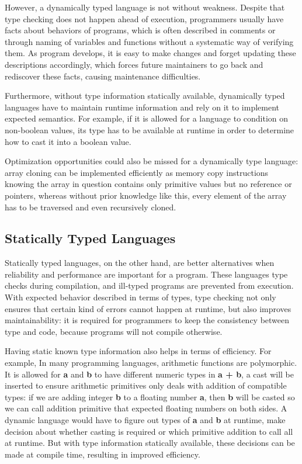 However, a dynamically typed language is not without weakness.
Despite that type checking does not happen ahead of execution,
programmers usually have facts about behaviors of programs,
which is often described in comments or through naming of variables and functions without a systematic way of verifying them.
As program develops, it is easy to make changes and forget updating these descriptions accordingly, which forces future maintainers to go back and rediscover these facts, causing maintenance difficulties.

Furthermore, without type information statically available,
dynamically typed languages have to maintain runtime information and rely on it to implement expected semantics. For example, if it is allowed for a language to condition on non-boolean values, its type has to be available at runtime in order to determine how to cast it into a boolean value.

Optimization opportunities could also be missed for a dynamically type language: 
array cloning can be implemented efficiently as memory copy instructions knowing the array in question contains only primitive values but no reference or pointers, whereas without prior knowledge like this, every element of the array has to be traversed and even recursively cloned.

\subsection{Statically Typed Languages}

Statically typed languages, on the other hand, are better alternatives
when reliability and performance are important for a program.
These languages type checks during compilation, and ill-typed programs are prevented from execution.
With expected behavior described in terms of types, type checking not only ensures that certain kind of errors cannot happen at runtime, but also improves maintainability: it is required for programmers to keep the consistency between type and code, because programs will not compile otherwise.

Having static known type information also helps in terms of efficiency.
For example, In many programming languages, arithmetic functions are polymorphic.
It is allowed for \textbf{a} and \textbf{b} to have different numeric types in \textbf{a + b}, a cast will be inserted to ensure arithmetic primitives only deals with addition of compatible types: if we are adding integer \textbf{b} to a floating number \textbf{a}, then \textbf{b} will be casted so we can call addition primitive that expected floating numbers on both sides.
A dynamic language would have to figure out types of \textbf{a} and \textbf{b} at runtime, make decision about whether casting is required or which primitive addition to call all at runtime. But with type information statically available, these decisions can be made at compile time, resulting in improved efficiency.

